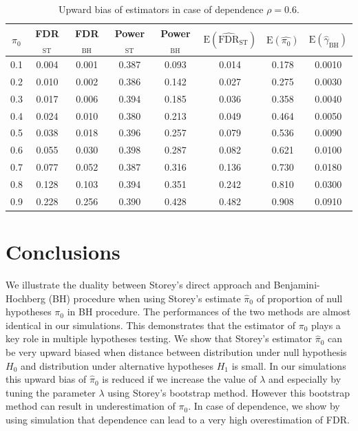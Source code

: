 \documentclass[10pt]{article}
\begin{document}
\begin{table}[H]
	\centering	
	\begin{tabular}{cccccccc}
		$\pi_{0}$ & FDR$_{\text{ST}}$ & FDR$_{\text{BH}}$ & Power$_{\text{ST}}$ & Power$_{\text{BH}}$ & $\text{E} (\widehat{\text{FDR}}_{\text{ST}} )$ & $\text{E}(\widehat{\pi_{0}})$ & $\text{E}(\widehat{\gamma}_{\text{BH}})$ \\ 
		  \hline
		0.1 & 0.004 & 0.001 & 0.387 & 0.093 & 0.014 & 0.178 & 0.0010 \\ 
		0.2 & 0.010 & 0.002 & 0.386 & 0.142 & 0.027 & 0.275 & 0.0030 \\ 
		0.3 & 0.017 & 0.006 & 0.394 & 0.185 & 0.036 & 0.358 & 0.0040 \\ 
		0.4 & 0.024 & 0.010 & 0.380 & 0.213 & 0.049 & 0.464 & 0.0050 \\ 
		0.5 & 0.038 & 0.018 & 0.396 & 0.257 & 0.079 & 0.536 & 0.0090 \\ 
		0.6 & 0.055 & 0.030 & 0.398 & 0.287 & 0.082 & 0.621 & 0.0100 \\ 
		0.7 & 0.077 & 0.052 & 0.387 & 0.316 & 0.136 & 0.730 & 0.0180 \\ 
		0.8 & 0.128 & 0.103 & 0.394 & 0.351 & 0.242 & 0.810 & 0.0300 \\ 
		0.9 & 0.228 & 0.256 & 0.390 & 0.428 & 0.482 & 0.908 & 0.0910 \\ 
		\hline
	\end{tabular}
	\caption{Upward bias of estimators in case of dependence $\rho = 0.6$.}
	\label{tab: dependence}	
\end{table}

\section{Conclusions}
We illustrate the duality between Storey's direct approach and Benjamini-Hochberg (BH) procedure when using Storey's estimate $\widehat{\pi}_{0}$ of proportion of null hypotheses $\pi_{0}$ in BH procedure. The performances of the two methods are almost identical in our simulations. This demonstrates that the estimator of $\pi_{0}$ plays a key role in multiple hypotheses testing. We show that Storey's estimator $\widehat{\pi}_{0}$ can be very upward biased when distance between distribution under null hypothesis $H_{0}$ and distribution under alternative hypotheses $H_{1}$ is small. In our simulations this upward bias of $\widehat{\pi}_{0}$ is reduced if we increase the value of $\lambda$ and especially by tuning the parameter $\lambda$ using Storey's bootstrap method. However this bootstrap method can result in underestimation of $\pi_{0}$. In case of dependence, we show by using simulation that dependence can lead to a very high overestimation of FDR.



\end{document}
